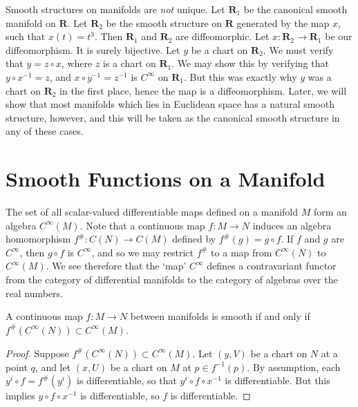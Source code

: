 \begin{example}
    Smooth structures on manifolds are {\it not} unique. Let $\mathbf{R}_1$ be the canonical smooth manifold on $\mathbf{R}$. Let $\mathbf{R}_2$ be the smooth structure on $\mathbf{R}$ generated by the map $x$, such that $x(t) = t^3$. Then $\mathbf{R}_1$ and $\mathbf{R}_2$ are diffeomorphic. Let $x:\mathbf{R}_2 \to \mathbf{R}_1$ be our diffeomorphism. It is surely bijective. Let $y$ be a chart on $\mathbf{R}_2$. We must verify that $y = z \circ x$, where $z$ is a chart on $\mathbf{R}_1$. We may show this by verifying that $y \circ x^{-1} = z$, and $x \circ y^{-1} = z^{-1}$ is $C^\infty$ on $\mathbf{R}_1$. But this was exactly why $y$ was a chart on $\mathbf{R}_2$ in the first place, hence the map is a diffeomorphism. Later, we will show that most manifolds which lies in Euclidean space has a natural smooth structure, however, and this will be taken as the canonical smooth structure in any of these cases.
\end{example}

\section{Smooth Functions on a Manifold}

The set of all scalar-valued differentiable maps defined on a manifold $M$ form an algebra $C^\infty(M)$. Note that a continuous map $f: M \to N$ induces an algebra homomorphism $f^\#: C(N) \to C(M)$ defined by $f^\#(g) = g \circ f$. If $f$ and $g$ are $C^\infty$, then $g \circ f$ is $C^\infty$, and so we may restrict $f^\#$ to a map from $C^\infty(N)$ to $C^\infty(M)$. We see therefore that the `map' $C^\infty$ defines a contravariant functor from the category of differential manifolds to the category of algebras over the real numbers.

\begin{lemma}
    A continuous map $f:M \to N$ between manifolds is smooth if and only if $f^\#(C^\infty(N)) \subset C^\infty(M)$.
\end{lemma}
\begin{proof}
    Suppose $f^\#(C^\infty(N)) \subset C^\infty(M)$. Let $(y,V)$ be a chart on $N$ at a point $q$, and let $(x,U)$ be a chart on $M$ at $p \in f^{-1}(p)$. By assumption, each $y^i \circ f = f^\#(y^i)$ is differentiable, so that $y^i \circ f \circ x^{-1}$ is differentiable. But this implies $y \circ f \circ x^{-1}$ is differentiable, so $f$ is differentiable.
\end{proof}

